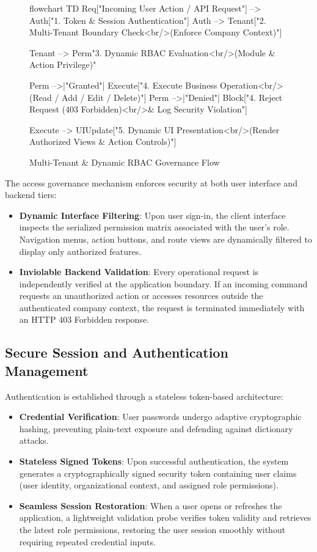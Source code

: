 \begin{figure}[H]
  \centering
  \begin{mermaid}[width=0.85\textwidth,height=0.8\textheight,keepaspectratio]
flowchart TD
    Req["Incoming User Action / API Request"] --> Auth["1. Token & Session Authentication"]
    Auth --> Tenant["2. Multi-Tenant Boundary Check<br/>(Enforce Company Context)"]
    
    Tenant --> Perm{"3. Dynamic RBAC Evaluation<br/>(Module & Action Privilege)"}
    
    Perm -->|"Granted"| Execute["4. Execute Business Operation<br/>(Read / Add / Edit / Delete)"]
    Perm -->|"Denied"| Block["4. Reject Request (403 Forbidden)<br/>& Log Security Violation"]
    
    Execute --> UIUpdate["5. Dynamic UI Presentation<br/>(Render Authorized Views & Action Controls)"]
  \end{mermaid}
  \caption{Multi-Tenant \& Dynamic RBAC Governance Flow}
  \label{fig:rbac_governance}
\end{figure}

The access governance mechanism enforces security at both user interface and backend tiers:
\begin{itemize}
  \item \textbf{Dynamic Interface Filtering}: Upon user sign-in, the client interface inspects the serialized permission matrix associated with the user's role. Navigation menus, action buttons, and route views are dynamically filtered to display only authorized features.
  \item \textbf{Inviolable Backend Validation}: Every operational request is independently verified at the application boundary. If an incoming command requests an unauthorized action or accesses resources outside the authenticated company context, the request is terminated immediately with an HTTP 403 Forbidden response.
\end{itemize}

\subsection{Secure Session and Authentication Management}
Authentication is established through a stateless token-based architecture:
\begin{itemize}
  \item \textbf{Credential Verification}: User passwords undergo adaptive cryptographic hashing, preventing plain-text exposure and defending against dictionary attacks.
  \item \textbf{Stateless Signed Tokens}: Upon successful authentication, the system generates a cryptographically signed security token containing user claims (user identity, organizational context, and assigned role permissions).
  \item \textbf{Seamless Session Restoration}: When a user opens or refreshes the application, a lightweight validation probe verifies token validity and retrieves the latest role permissions, restoring the user session smoothly without requiring repeated credential inputs.
\end{itemize}

